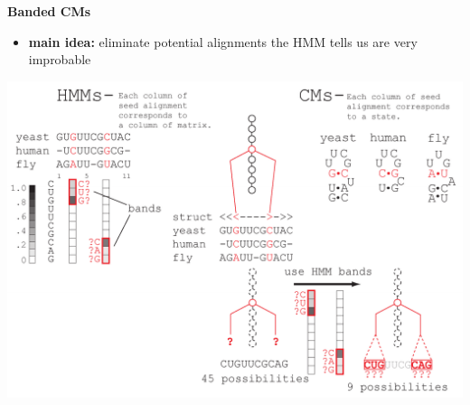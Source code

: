 \documentclass[landscape]{slides}
\begin{document}
\begin{slide}
\begin{center}
\large
\textbf{Banded CMs}
\end{center}
\medskip
\small
\begin{itemize}
\item
\textbf{main idea:} eliminate potential alignments the HMM tells us are very improbable
\end{itemize}
\begin{center}
\includegraphics[width=8in]{figs/post_hmm_to_cm_map2_layer16}
\end{center}
\vfill
\end{slide}
\end{document}
